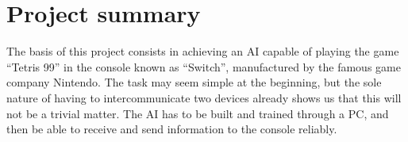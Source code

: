 
\chapter{Project summary}

The basis of this project consists in achieving an \ac{AI} capable of playing the game “Tetris 99” in the console known as “Switch”, manufactured by the famous game company Nintendo. The task may seem simple at the beginning, but the sole nature of having to intercommunicate two devices already shows us that this will not be a trivial matter. The AI has to be built and trained through a PC, and then be able to receive and send information to the console reliably.